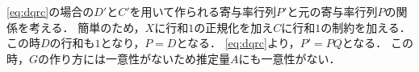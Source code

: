 \eqref{eq:dqrc}の場合の$D'$と$C'$を用いて作られる寄与率行列$P'$と元の寄与率行列$P$の関係を考える．
簡単のため，$X$に行和$1$の正規化を加え$C$に行和$1$の制約を加える．
この時$D$の行和も$1$となり，$P = D$となる．
\eqref{eq:dqrc}より，$P' = PQ$となる．
この時，$G$の作り方には一意性がないため推定量$A$にも一意性がない．

